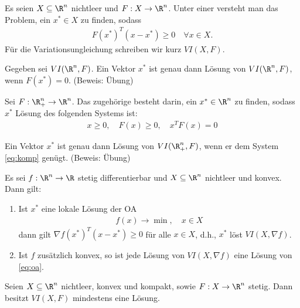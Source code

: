 \begin{definition}
  Es seien $X\subseteq \R^{n}$ nichtleer und $F: X \to \R^{n}$. Unter einer  versteht man das Problem, ein $x^{*} \in X$ zu finden, sodass
  \begin{align*}
    F(x^{*})^{T}(x - x^{*}) \geq 0 \quad \forall x \in X. 
  \end{align*}
Für die Variationsungleichung schreiben wir kurz $VI(X, F)$. 
\end{definition}
\begin{proposition}
  Gegeben sei $VI(\R^{n}, F)$. Ein Vektor $x^{*}$ ist genau dann Lösung von $VI(\R^{n}, F)$, wenn $F(x^{*}) = 0$.  (Beweis: Übung)
\end{proposition}
\begin{definition}
  Sei $F: \R^{n}_{+} \to \R^{n}$. Das zugehörige  besteht darin, ein $x^{*} \in \R^{n}$ zu finden, sodass $x^{*}$ Lösung des folgenden Systems ist:
  \begin{align}\label{eq:komp}
    x \geq 0,\quad F(x)\geq 0,\quad x^{T}F(x) = 0
  \end{align}
\end{definition}
\begin{proposition}
  Ein Vektor $x^{*}$ ist genau dann Lösung von $VI(\R^{n}_{+}, F)$, wenn er dem System \eqref{eq:komp} genügt. (Beweis: Übung)
\end{proposition}
\begin{lemma}
  Es sei $f:\R^{n} \to \R$ stetig differentierbar und $X\subseteq \R^{n}$ nichtleer und konvex. Dann gilt: 
  \begin{enumerate}
  \item Ist $x^{*}$ eine lokale Lösung der OA
    \begin{align}\label{eq:oa}
      f(x) \to \min, \quad x \in X
    \end{align}
dann gilt $\nabla f(x^{*})^{T}(x - x^{*})\geq 0$ für alle $x \in X$, d.h., $x^{*}$ löst $VI(X, \nabla f)$. 
\item Ist $f$ zusätzlich konvex, so ist jede Lösung von $VI(X, \nabla f)$ eine Lösung von \eqref{eq:oa}.
  \end{enumerate}
\end{lemma}
  \begin{satz}
    Seien $X \subseteq \R^{n}$ nichtleer, konvex und kompakt, sowie $F: X \to \R^{n}$ stetig. Dann besitzt $VI(X, F)$ mindestens eine Lösung. 
  \end{satz}
